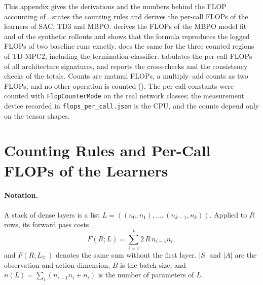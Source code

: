 This appendix gives the derivations and the numbers behind the FLOP accounting of .
 states the counting rules and derives the per-call FLOPs of the learners of SAC, TD3 and MBPO.
 derives the FLOPs of the MBPO model fit and of the synthetic rollouts and shows that the formula reproduces the logged FLOPs of two baseline runs exactly.
 does the same for the three counted regions of TD-MPC2, including the termination classifier.
 tabulates the per-call FLOPs of all architecture signatures, and  reports the cross-checks and the consistency checks of the totals.
Counts are matmul FLOPs, a multiply--add counts as two FLOPs, and no other operation is counted ().
The per-call constants were counted with \texttt{FlopCounterMode} on the real network classes; the measurement device recorded in \texttt{flops\_\allowbreak per\_\allowbreak call.json} is the CPU, and the counts depend only on the tensor shapes.

\section{Counting Rules and Per-Call FLOPs of the Learners}\label{sec:app-flop-rules}

\paragraph{Notation.} A stack of dense layers is a list $L=((n_0,n_1),\dots,(n_{k-1},n_k))$.
Applied to $R$ rows, its forward pass costs
\begin{equation}
  F(R;L) = \sum_{i=1}^{k} 2\,R\,n_{i-1}n_i ,
  \label{eq:app-fwd}
\end{equation}
and $F(R;L_{2:})$ denotes the same sum without the first layer.
$|S|$ and $|A|$ are the observation and action dimension, $B$ is the batch size, and $n(L)=\sum_i (n_{i-1}n_i+n_i)$ is the number of parameters of $L$.

